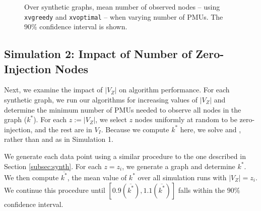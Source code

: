 {\begin{figure}[t]
\begin{center}
  \end{center}
	\caption{Over synthetic graphs, mean number of observed nodes -- using {\tt xvgreedy} and {\tt xvoptimal} -- when varying number of PMUs. The $90\%$ confidence interval is shown.}
  \label{fig:xv-res}
\end{figure}





\subsection{Simulation 2: Impact of Number of Zero-Injection Nodes}
\label{subsec:zero}

Next, we examine the impact of $|V_Z|$ on algorithm performance. 
For each synthetic graph, we run our algorithms for increasing values of $|V_Z|$ and determine the minimum number of PMUs needed to observe all nodes in the graph ($k^*$).
For each $z:=|V_Z|$, we select $z$ nodes uniformly at random to be zero-injection, and the rest are in $V_I$. Because we compute $k^*$ here, we solve \full and \xvals, rather than
\maxinc and \xvalparts as in Simulation 1.

We generate each data point using a similar procedure to the one described in Section \ref{subsec:synth}.  
For each $z=z_i$, we generate a graph and determine $k^*$. %
We then compute $\overline{k^*}$, the mean value of $k^*$ over all simulation runs with $|V_Z| = z_i$.
We continue this procedure until $[0.9(\overline{k^*}),1.1(\overline{k^*})]$ falls within the $90\%$ confidence interval.

}
